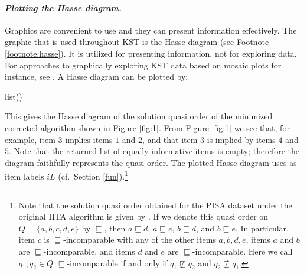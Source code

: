 \documentclass[nojss]{jss}
\begin{document}
\paragraph{\it Plotting the Hasse diagram.}
Graphics are convenient to use and they can present information effectively.
The graphic that is used throughout KST is the Hasse diagram (see Footnote \ref{footnote:hasse}). 
It is utilized for presenting information, not for exploring data.
For approaches to graphically exploring KST data based on mosaic plots
for instance, see \cite{US:09}.
A Hasse diagram can be plotted by:
\begin{CodeChunk}
\begin{CodeOutput}
list()
\end{CodeOutput}
\end{CodeChunk}
This gives the Hasse diagram of the solution quasi order of the minimized corrected algorithm shown in Figure \ref{fig:1}. From Figure \ref{fig:1} we see that, for example, item $3$ implies 
items $1$ and $2$, and that item $3$ is implied by items $4$ and $5$. 
Note that the returned list of equally informative items is empty; therefore the diagram faithfully represents the quasi order. The plotted Hasse diagram uses as item labels $iL$
(cf.\ Section \ref{fun}).\footnote{\label{footn:origsol}Note that the solution quasi order obtained 
for the PISA dataset
under the original IITA algorithm is given by . If we 
denote this quasi order on $Q=\{a,b,c,d,e\}$ by $\sqsubseteq$, then $a\sqsubseteq d$,
$a\sqsubseteq e$, $b\sqsubseteq d$, and $b\sqsubseteq e$. In particular, item $c$ is 
$\sqsubseteq$-incomparable with any of the other items $a,b,d,e$, items $a$ and $b$ are 
$\sqsubseteq$-incomparable, and items $d$ and $e$ are $\sqsubseteq$-incomparable.
Here we call $q_1,q_2\in Q$ $\sqsubseteq$-incomparable if and only if 
$q_1\not\sqsubseteq q_2$ and $q_2\not\sqsubseteq q_1$.}
\end{document}
